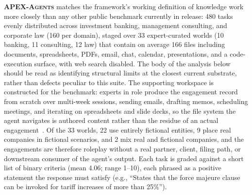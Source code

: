 \documentclass{article}
\begin{document}
\textbf{\textsc{APEX-Agents}} matches the framework's working definition of knowledge work more closely than any other public benchmark currently in release: 480 tasks evenly distributed across investment banking, management consulting, and corporate law (160 per domain), staged over 33 expert-curated worlds (10 banking, 11 consulting, 12 law) that contain on average 166 files including documents, spreadsheets, PDFs, email, chat, calendar, presentations, and a code-execution surface, with web search disabled.
The body of the analysis below should be read as identifying structural limits at the closest current substrate, rather than defects peculiar to this suite.
The supporting workspace is constructed for the benchmark: experts in role produce the engagement record from scratch over multi-week sessions, sending emails, drafting memos, scheduling meetings, and iterating on spreadsheets and slide decks, so the file system the agent navigates is authored content rather than the residue of an actual engagement~\citep{vidgen2026apexagents}.
Of the 33 worlds, 22 use entirely fictional entities, 9 place real companies in fictional scenarios, and 2 mix real and fictional companies, and the engagements are therefore roleplay without a real partner, client, filing path, or downstream consumer of the agent's output.
Each task is graded against a short list of binary criteria (mean 4.06; range 1--10), each phrased as a positive statement the response must satisfy (e.g., ``States that the force majeure clause can be invoked for tariff increases of more than 25\%'').
\end{document}
